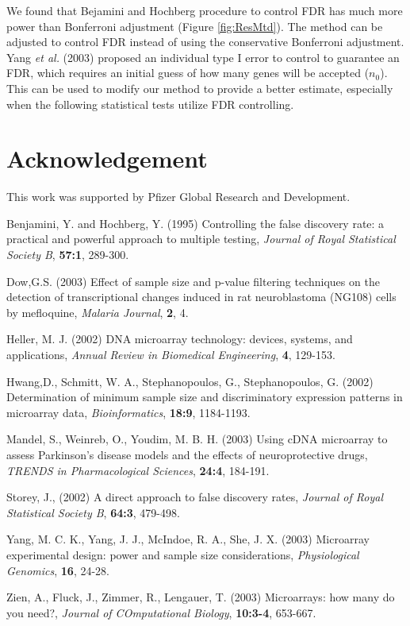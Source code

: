 \documentclass{bioinfo}
\begin{document}
We found that Bejamini and Hochberg procedure to control FDR has
much more power than Bonferroni adjustment (Figure
\ref{fig:ResMtd}). The method can be adjusted to control FDR
instead of using the conservative Bonferroni adjustment. Yang
\textit{et al.} (2003) proposed an individual type I error to
control to guarantee an FDR, which requires an initial guess of
how many genes will be accepted ($n_0$). This can be used to
modify our method to provide a better estimate, especially when
the following statistical tests utilize FDR controlling.


\section*{Acknowledgement}
This work was supported by Pfizer Global Research and Development.

\begin{thebibliography}{}

 Benjamini, Y. and Hochberg, Y. (1995)
  Controlling the false discovery rate: a practical and powerful
  approach to multiple testing, {\it Journal of Royal Statistical
    Society B}, {\bf 57:1}, 289-300.

 Dow,G.S. (2003) Effect of sample size and p-value filtering techniques on the detection of transcriptional changes induced in
  rat neuroblastoma (NG108) cells by mefloquine, {\it Malaria Journal}, {\bf 2}, 4.

 Heller, M. J. (2002) {DNA microarray technology: devices, systems, and applications},
  {\it Annual Review in Biomedical Engineering}, {\bf 4}, 129-153.

 Hwang,D., Schmitt, W. A., Stephanopoulos, G., Stephanopoulos, G. (2002)
  Determination of minimum sample size and discriminatory expression patterns in microarray data,
  {\it Bioinformatics}, {\bf 18:9}, 1184-1193.

 Mandel, S.,  Weinreb, O., Youdim, M. B. H. (2003)
  Using cDNA microarray to assess Parkinson's disease models and
  the effects of neuroprotective drugs, {\it TRENDS in Pharmacological Sciences}, {\bf 24:4}, 184-191.

 Storey, J., (2002)
  A direct approach to false discovery rates, {\it Journal of Royal Statistical Society B}, {\bf 64:3}, 479-498.

 Yang, M. C. K., Yang, J. J., McIndoe, R. A., She, J. X. (2003)
  Microarray experimental design: power and sample size considerations, {\it Physiological Genomics}, {\bf 16}, 24-28.

 Zien, A., Fluck, J., Zimmer, R., Lengauer, T. (2003)
  Microarrays: how many do you need?, {\it Journal of COmputational Biology}, {\bf 10:3-4}, 653-667.
\end{thebibliography}
\end{document}
